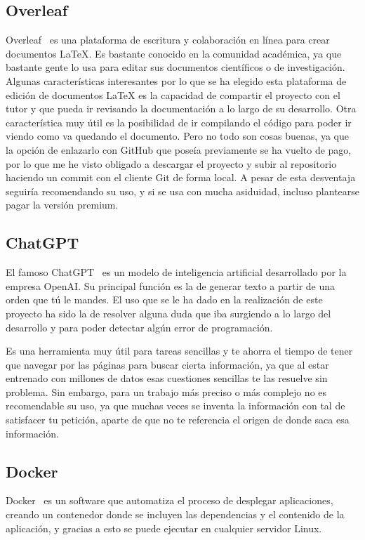 \subsection{Overleaf}
Overleaf~\cite{overleaf} es una plataforma de escritura y colaboración en línea para crear documentos LaTeX. Es bastante conocido en la comunidad académica, ya que bastante gente lo usa para editar sus documentos científicos o de investigación. Algunas características interesantes por lo que se ha elegido esta plataforma de edición de documentos LaTeX es la capacidad de compartir el proyecto con el tutor y que pueda ir revisando la documentación a lo largo de su desarrollo. Otra característica muy útil es la posibilidad de ir compilando el código para poder ir viendo como va quedando el documento. Pero no todo son cosas buenas, ya que la opción de enlazarlo con GitHub que poseía previamente se ha vuelto de pago, por lo que me he visto obligado a descargar el proyecto y subir al repositorio haciendo un commit con el cliente Git de forma local.
A pesar de esta desventaja seguiría recomendando su uso, y si se usa con mucha asiduidad, incluso plantearse pagar la versión premium.

\subsection{ChatGPT}
El famoso ChatGPT~\cite{chatGPT} es un modelo de inteligencia artificial desarrollado por la empresa OpenAI. Su principal función es la de generar texto a partir de una orden que tú le mandes. El uso que se le ha dado en la realización de este proyecto ha sido la de resolver alguna duda que iba surgiendo a lo largo del desarrollo y para poder detectar algún error de programación.

Es una herramienta muy útil para tareas sencillas y te ahorra el tiempo de tener que navegar por las páginas para buscar cierta información, ya que al estar entrenado con millones de datos esas cuestiones sencillas te las resuelve sin problema. Sin embargo, para un trabajo más preciso o más complejo no es recomendable su uso, ya que muchas veces se inventa la información con tal de satisfacer tu petición, aparte de que no te referencia el origen de donde saca esa información.

\subsection{Docker}
Docker~\cite{docker} es un software que automatiza el proceso de desplegar aplicaciones, creando un contenedor donde se incluyen las dependencias y el contenido de la aplicación, y gracias a esto se puede ejecutar en cualquier servidor Linux.

